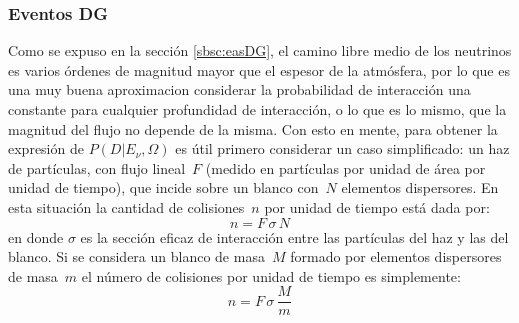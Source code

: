 	\subsubsection{Eventos DG}
	
	Como se expuso en la sección \ref{sbsc:easDG}, el camino libre medio de los neutrinos es varios órdenes de magnitud mayor que el espesor de la atmósfera, por lo que es una muy buena aproximacion considerar la probabilidad de interacción una constante para cualquier profundidad de interacción, o lo que es lo mismo, que la magnitud del flujo no depende de la misma.
	Con esto en mente, para obtener la expresión de $P(D|E_{\nu},\Omega)$ es útil primero considerar un caso simplificado: un haz de partículas, con flujo lineal~$F$ (medido en partículas por unidad de área por unidad de tiempo), que incide sobre un blanco con~$N$ elementos dispersores. En esta situación la cantidad de colisiones~$n$ por unidad de tiempo está dada por:
	\begin{equation}
	n = F\,\sigma\,N
	\end{equation}
	en donde $\sigma$ es la sección eficaz de interacción entre las partículas del haz y las del blanco.
	Si se considera un blanco de masa~$M$ formado por elementos dispersores de masa~$m$ el número de colisiones por unidad de tiempo es simplemente:
	\begin{equation}
	n = F\,\sigma\,\frac{M}{m}
	\end{equation}

